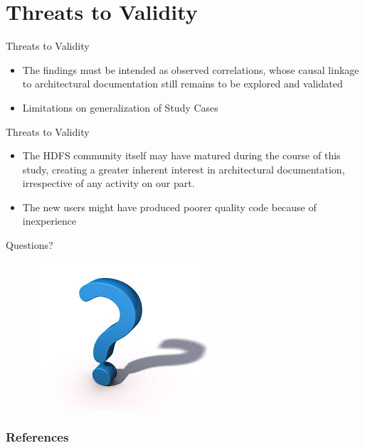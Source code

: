 \documentclass[t,14pt,mathserif]{beamer}
\begin{document}
\section{Threats to Validity}
\begin{frame}{Threats to Validity}
	\begin{itemize}
	     \item The findings must be intended as observed correlations, whose causal linkage to architectural documentation still remains to be explored and validated
         \item Limitations on generalization of Study Cases
        \end{itemize}

\end{frame}

\begin{frame}{Threats to Validity}
	\begin{itemize}
		\item The HDFS community itself may have matured during the course of this study, creating a greater inherent interest in architectural documentation, irrespective of any activity on our part.
		\item The new users might have produced poorer quality code because of inexperience
	\end{itemize}
	
\end{frame}

\begin{frame}{Questions?}

	\begin{figure}[hbtp]
		\centering
	\includegraphics[scale=1]{../img/questions.jpg}
	\end{figure}
	

\end{frame}


\begin{frame}[allowframebreaks]
   \frametitle{References}
   
   
\end{frame}
\end{document}
